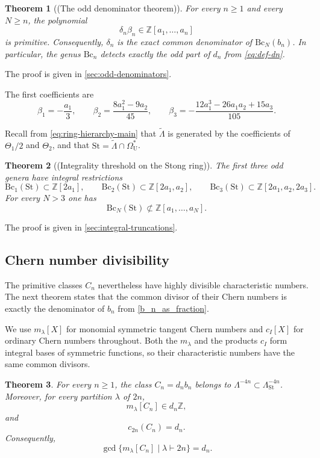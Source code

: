\documentclass[14pt,dvipsnames]{extarticle}
\numberwithin{equation}{subsection}
\theoremstyle{plain}
\newtheorem{theorem}[theorem]{Theorem}
\theoremstyle{definition}
\theoremstyle{definition}
\newcommand{\OmU}{\Omega_{\mathrm U}^{\ast}}
\newcommand{\Bc}{\mathrm{Bc}}
\newcommand{\St}{\mathrm{St}}
\newcommand{\LambdaSt}{\Lambda_{\mathrm{St}}}
\begin{document}
\begin{theorem}[(The odd denominator theorem)]\label{thm:bc-odd-denominator}
For every $n\geq1$ and every $N\geq n$, the polynomial
\[
 \delta_n\beta_n\in\mathbb Z[a_1,\ldots,a_n]
\]
is primitive. Consequently, $\delta_n$ is the exact common denominator of
$\Bc_N(b_n)$. In particular, the genus $\Bc_n$ detects exactly the odd part
of $d_n$ from \eqref{eq:def-dn}.
\end{theorem}

The proof is given in \cref{sec:odd-denominators}.

The first coefficients are
\[
 \beta_1=-\frac{a_1}{3},\qquad
 \beta_2=\frac{8a_1^2-9a_2}{45},\qquad
 \beta_3=-\frac{12a_1^3-26a_1a_2+15a_3}{105}.
\]

Recall from \eqref{eq:ring-hierarchy-main} that $\widetilde\Lambda$ is generated
by the coefficients of $\Theta_1/2$ and $\Theta_2$, and that
$\St=\widetilde\Lambda\cap\OmU$.

\begin{theorem}[(Integrality threshold on the Stong ring)]
\label{thm:bc-stong-threshold}
The first three odd genera have integral restrictions
\[
 \Bc_1(\St)\subset\mathbb Z[2a_1],\qquad
 \Bc_2(\St)\subset\mathbb Z[2a_1,a_2],\qquad
 \Bc_3(\St)\subset\mathbb Z[2a_1,a_2,2a_3].
\]
For every $N>3$ one has
\[
 \Bc_N(\St)\not\subset\mathbb Z[a_1,\ldots,a_N].
\]
\end{theorem}

The proof is given in \cref{sec:integral-truncations}.

\subsection{Chern number divisibility}

The primitive classes $C_n$ nevertheless have highly divisible characteristic
numbers. The next theorem states that the common divisor of their Chern
numbers is exactly the denominator of $b_n$ from \eqref{b_n_as_fraction}.

We use $m_\lambda[X]$ for monomial symmetric tangent Chern numbers and $c_I[X]$
for ordinary Chern numbers throughout. Both the $m_\lambda$ and the products
$c_I$ form integral bases of symmetric functions, so their characteristic
numbers have the same common divisors.


\begin{theorem}\label{thm:chern-divisibility}
For every $n\geq1$, the class $C_n=d_nb_n$ belongs to $\Lambda^{-4n}\subset\LambdaSt^{-4n}$. Moreover,
for every partition $\lambda$ of $2n$,
\[
 m_\lambda[C_n]\in d_n\mathbb Z,
\]
and
\[
 c_{2n}(C_n)=d_n.
\]
Consequently,
\[
 \gcd\{m_\lambda[C_n]\mid\lambda\vdash2n\}=d_n.
\]
\end{theorem}
\end{document}
